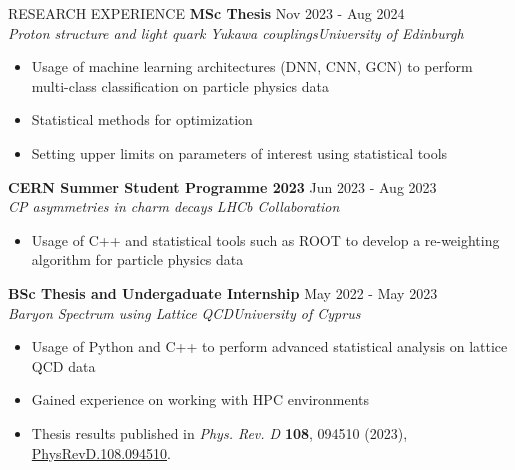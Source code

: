 \documentclass{resume} %
\begin{document}
        \begin{rSection}{RESEARCH EXPERIENCE}
                \textbf{MSc Thesis} \hfill Nov 2023 - Aug 2024\\
                {\it Proton structure and light quark Yukawa couplings}\hfill \textit{University of Edinburgh}
                \begin{itemize}
                        \item Usage of machine learning architectures (DNN, CNN, GCN) to perform multi-class classification on particle physics data
                        \item Statistical methods for optimization
                        \item Setting upper limits on parameters of interest using statistical tools
                \end{itemize}

                \textbf{CERN Summer Student Programme 2023} \hfill Jun 2023 - Aug 2023\\
                {\it CP asymmetries in charm decays}
                \hfill \textit{LHCb Collaboration}
                \begin{itemize}
                        \itemsep -3pt {}
                        \item Usage of C++ and statistical tools such as ROOT to develop a re-weighting algorithm for particle physics data
                \end{itemize}

                \textbf{BSc Thesis and Undergaduate Internship} \hfill May 2022 - May 2023\\
                {\it Baryon Spectrum using Lattice QCD}\hfill \textit{University of Cyprus}
                \begin{itemize}
                        \itemsep -3pt {} 
                        \item Usage of Python and C++ to perform advanced statistical analysis on lattice QCD data
                        \item Gained experience on working with HPC environments
                        \item Thesis results published in \textit{Phys. Rev. D} \textbf{108}, 094510 (2023), \href{https://doi.org/10.1103/PhysRevD.108.094510}{PhysRevD.108.094510}.
                \end{itemize}
        \end{rSection} 

        \bigbreak
\end{document}
